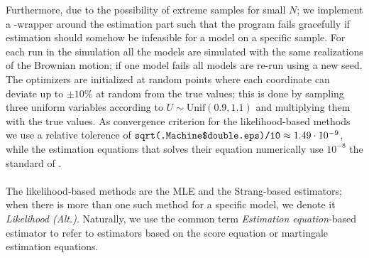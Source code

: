 Furthermore, due to the possibility of extreme samples for small $N$; we implement a -wrapper around the estimation part such that the program fails gracefully if estimation should somehow be infeasible for a model on a specific sample. For each run in the simulation all the models are simulated with the same realizations of the Brownian motion; if one model fails all models are re-run using a new seed. The optimizers are initialized at random points where each coordinate can deviate up to $\pm 10\%$ at random from the true values; this is done by sampling three uniform variables according to $U\sim\mathrm{Unif}(0.9, 1.1)$ and multiplying them with the true values. As convergence criterion for the likelihood-based methods we use a relative tolerence of $\texttt{sqrt(.Machine\$double.eps)/10}\approx 1.49\cdot 10^{-9}$, while the estimation equations that solves their equation numerically use $10^{-8}$ the standard of . \\\\
The likelihood-based methods are the MLE and the Strang-based estimators; when there is more than one such method for a specific model, we denote it \textit{Likelihood (Alt.)}. Naturally, we use the common term \textit{Estimation equation}-based estimator to refer to estimators based on the score equation or martingale estimation equations.
\newpage
